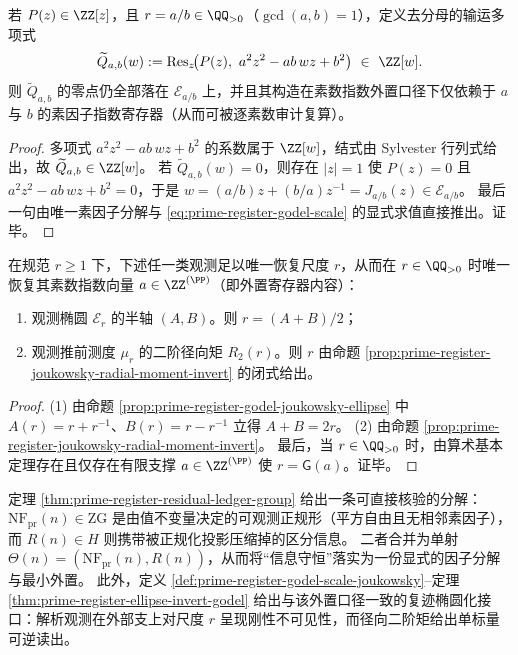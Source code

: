 \begin{corollary}\label{cor:prime-register-rational-godel-integer-closure}
若 \(P(z)\in\ZZ[z]\)，且 \(r=a/b\in\QQ_{>0}\)（\(\gcd(a,b)=1\)），定义去分母的输运多项式
\[
\widetilde Q_{a,b}(w)
:=\operatorname{Res}_{z}\!\bigl(P(z),\ a^2 z^2-a b\,w z+b^2\bigr)\ \in\ \ZZ[w].
\]
则 \(\widetilde Q_{a,b}\) 的零点仍全部落在 \(\mathcal E_{a/b}\) 上，并且其构造在素数指数外置口径下仅依赖于 \(a\) 与 \(b\) 的素因子指数寄存器（从而可被逐素数审计复算）。
\end{corollary}
\begin{proof}
多项式 \(a^2 z^2-a b\,w z+b^2\) 的系数属于 \(\ZZ[w]\)，结式由 Sylvester 行列式给出，故 \(\widetilde Q_{a,b}\in\ZZ[w]\)。
若 \(\widetilde Q_{a,b}(w)=0\)，则存在 \(|z|=1\) 使 \(P(z)=0\) 且 \(a^2 z^2-a b\,w z+b^2=0\)，于是
\(
w=(a/b)z+(b/a)z^{-1}
=J_{a/b}(z)\in\mathcal E_{a/b}
\)。
最后一句由唯一素因子分解与 \eqref{eq:prime-register-godel-scale} 的显式求值直接推出。证毕。
\end{proof}

\begin{theorem}\label{thm:prime-register-ellipse-invert-godel}
在规范 \(r\ge 1\) 下，下述任一类观测足以唯一恢复尺度 \(r\)，从而在 \(r\in\QQ_{>0}\) 时唯一恢复其素数指数向量 \(a\in\ZZ^{(\PP)}\)（即外置寄存器内容）：
\begin{enumerate}
  \item 观测椭圆 \(\mathcal E_r\) 的半轴 \((A,B)\)。则 \(r=(A+B)/2\)；
  \item 观测推前测度 \(\mu_r\) 的二阶径向矩 \(R_2(r)\)。则 \(r\) 由命题 \ref{prop:prime-register-joukowsky-radial-moment-invert} 的闭式给出。
\end{enumerate}
\end{theorem}
\begin{proof}
(1) 由命题 \ref{prop:prime-register-godel-joukowsky-ellipse} 中 \(A(r)=r+r^{-1}\)、\(B(r)=r-r^{-1}\) 立得 \(A+B=2r\)。
(2) 由命题 \ref{prop:prime-register-joukowsky-radial-moment-invert}。
最后，当 \(r\in\QQ_{>0}\) 时，由算术基本定理存在且仅存在有限支撑 \(a\in\ZZ^{(\PP)}\) 使 \(r=\mathsf{G}(a)\)。证毕。
\end{proof}



\begin{remark}[可观测正规形与外置账本的分解接口]\label{rem:prime-register-observable-vs-ledger}
定理 \ref{thm:prime-register-residual-ledger-group} 给出一条可直接核验的分解：
\(\mathrm{NF}_{\mathrm{pr}}(n)\in\mathrm{ZG}\) 是由值不变量决定的可观测正规形（平方自由且无相邻素因子），而 \(R(n)\in H\) 则携带被正规化投影压缩掉的区分信息。
二者合并为单射 \(\Theta(n)=(\mathrm{NF}_{\mathrm{pr}}(n),R(n))\)，从而将“信息守恒”落实为一份显式的因子分解与最小外置。
此外，定义 \ref{def:prime-register-godel-scale-joukowsky}--定理 \ref{thm:prime-register-ellipse-invert-godel} 给出与该外置口径一致的复迹椭圆化接口：解析观测在外部支上对尺度 \(r\) 呈现刚性不可见性，而径向二阶矩给出单标量可逆读出。
\end{remark}



\endinput
